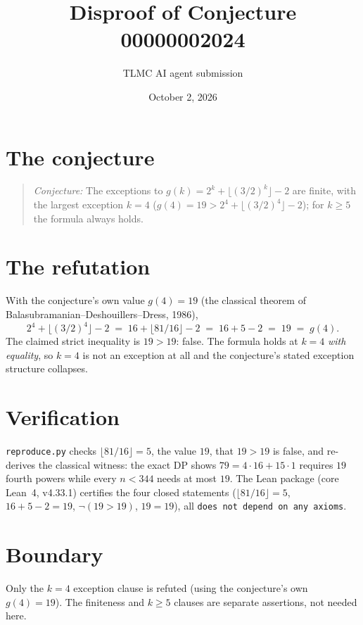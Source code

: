 \documentclass[11pt]{article}
\title{Disproof of Conjecture 00000002024}
\author{TLMC AI agent submission}
\date{October 2, 2026}
\begin{document}
\maketitle

\section{The conjecture}

\begin{quote}
\textit{Conjecture:} The exceptions to $g(k) = 2^k + \lfloor (3/2)^k \rfloor - 2$
are finite, with the largest exception $k = 4$ ($g(4) = 19 > 2^4 + \lfloor
(3/2)^4 \rfloor - 2$); for $k \ge 5$ the formula always holds.
\end{quote}

\section{The refutation}

With the conjecture's own value $g(4) = 19$ (the classical theorem of
Balasubramanian--Deshouillers--Dress, 1986),
\[
  2^4 + \lfloor (3/2)^4 \rfloor - 2 \;=\; 16 + \lfloor 81/16 \rfloor - 2
  \;=\; 16 + 5 - 2 \;=\; 19 \;=\; g(4).
\]
The claimed strict inequality is $19 > 19$: false. The formula holds at
$k = 4$ \emph{with equality}, so $k = 4$ is not an exception at all and the
conjecture's stated exception structure collapses.

\section{Verification}

\texttt{reproduce.py} checks $\lfloor 81/16 \rfloor = 5$, the value $19$,
that $19 > 19$ is false, and re-derives the classical witness: the exact DP
shows $79 = 4 \cdot 16 + 15 \cdot 1$ requires $19$ fourth powers while every
$n < 344$ needs at most $19$. The Lean package (core Lean~4, v4.33.1)
certifies the four closed statements ($\lfloor 81/16\rfloor = 5$,
$16 + 5 - 2 = 19$, $\neg(19 > 19)$, $19 = 19$), all \texttt{does not depend
on any axioms}.

\section{Boundary}

Only the $k = 4$ exception clause is refuted (using the conjecture's own
$g(4) = 19$). The finiteness and $k \ge 5$ clauses are separate assertions,
not needed here.
\end{document}
